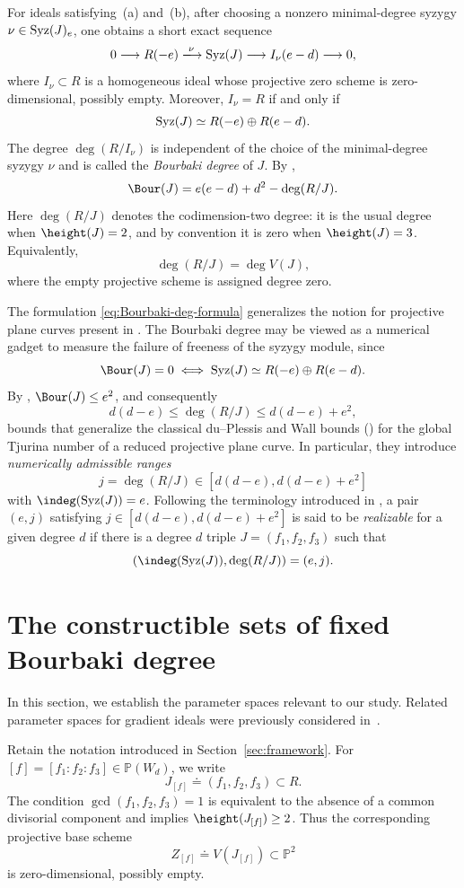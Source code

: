 \documentclass[11pt]{amsart} %
\theoremstyle{definition}
\def\syz{\mbox{\rm Syz}}
\def\NZQ{\mathbb}               %
\def\PP{{\NZQ P}}
\begin{document}
For ideals satisfying~(a) and~(b), after choosing a nonzero
minimal-degree syzygy $\nu\in\syz(J)_e$, one obtains a short exact
sequence
\[
0\longrightarrow
R(-e)
\xlongrightarrow{\nu}
\syz(J)
\longrightarrow
I_\nu(e-d)
\longrightarrow0,
\]
where $I_\nu\subset R$ is a homogeneous ideal whose projective zero
scheme is zero-dimensional, possibly empty. Moreover,
$I_\nu=R$ if and only if
\[
\syz(J)\simeq R(-e)\oplus R(e-d).
\]
The degree $\deg(R/I_\nu)$ is independent of the choice of the
minimal-degree syzygy $\nu$ and is called the \emph{Bourbaki degree}
of $J$. By \cite[Theorem~1.2]{JMNRS2026},
\begin{equation}\label{eq:Bourbaki-deg-formula}
\Bour(J)=e(e-d)+d^2-\deg(R/J).
\end{equation}
Here $\deg(R/J)$ denotes the codimension-two degree: it is the usual
degree when $\height(J)=2$, and by convention it is zero when $\height(J)=3$. Equivalently,
\[
\deg(R/J)=\deg V(J),
\]
where the empty projective scheme is assigned degree zero.

The formulation \eqref{eq:Bourbaki-deg-formula} generalizes the notion for projective plane curves present in \cite{MAA}. The Bourbaki degree may be viewed as a numerical gadget to measure the failure of freeness of the syzygy module, since
$$
\Bour(J) = 0 \iff \syz(J) \simeq R(-e)\oplus R(e-d).
$$
By \cite[Theorem~2.1]{JMNRS2026}, \(\Bour(J)\leq e^2\), and consequently
\[
d(d-e)\leq \deg(R/J)\leq d(d-e)+e^2,
\]
bounds that generalize the classical du--Plessis and Wall bounds (\cite[Theorem 3.2]{CTC-Plessis}) for the global Tjurina number of a reduced projective plane curve. In particular, they introduce \emph{numerically admissible ranges}
$$
j=\deg(R/J) \in [d(d-e), d(d-e)+e^2]
$$
with $\indeg(\syz(J))=e$. Following the terminology introduced in \cite{JMNRS2026}, a pair $(e,j)$ satisfying $j \in [d(d-e), d(d-e)+e^2]$ is said to be \emph{realizable} for a given degree $d$ if there is a degree $d$ triple $J = (f_1, f_2, f_3)$ such that
$$
(\indeg(\syz(J)), \deg(R/J))=(e,j).
$$

\section{The constructible sets of fixed Bourbaki degree}\label{sec:constructible}

In this section, we establish the parameter spaces relevant to our
study. Related parameter spaces for gradient ideals were previously
considered in~\cite{Futata2023}.

Retain the notation introduced in Section~\ref{sec:framework}. For \([f]=[f_1:f_2:f_3]\in\PP(W_d)\), we write
\[
J_{[f]}\doteq(f_1,f_2,f_3)\subset R.
\]
The condition \(\gcd(f_1,f_2,f_3)=1\) is equivalent to the absence of a common divisorial component and
implies $\height(J_{[f]})\geq2$. Thus the corresponding projective
base scheme
\[
Z_{[f]}\doteq V(J_{[f]})\subset\PP^2
\]
is zero-dimensional, possibly empty.
\end{document}
